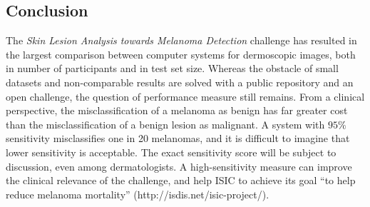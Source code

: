 \documentclass[10pt,letterpaper]{article}
\begin{document}
\subsection*{Conclusion}

The {\it Skin Lesion Analysis towards Melanoma Detection} challenge has resulted in the largest comparison between computer systems for dermoscopic images, both in number of participants and in test set size. 
Whereas the obstacle of small datasets and non-comparable results are solved with a public repository and an open challenge, the question of performance measure still remains. 
From a clinical perspective, the misclassification of a melanoma as benign has far greater cost than the misclassification of a benign lesion as malignant. 
A system with $95\%$ sensitivity misclassifies one in 20 melanomas, and it is difficult to imagine that lower sensitivity is acceptable. 
The exact sensitivity score will be subject to discussion, even among dermatologists. 
A high-sensitivity measure can improve the clinical relevance of the challenge, and help ISIC to achieve its goal ``to help reduce melanoma mortality'' (http://isdis.net/isic-project/). 





\nolinenumbers

%
%
% 



%
%
%
%
\end{document}
